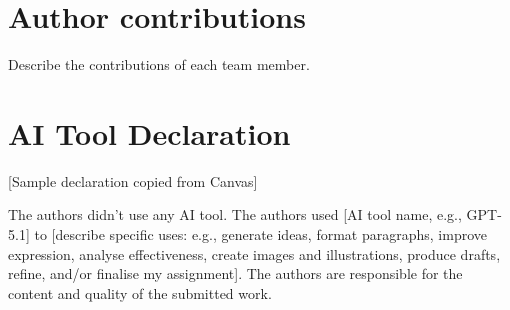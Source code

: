 \documentclass{article}
\begin{document}
\section{Author contributions}
Describe the contributions of each team member.

\section{AI Tool Declaration}

[Sample declaration copied from Canvas]

The authors didn't use any AI tool. The authors used [AI tool name, e.g., GPT-5.1] to [describe specific uses: e.g., generate ideas, format paragraphs, improve expression, analyse effectiveness, create images and illustrations, produce drafts, refine, and/or finalise my assignment]. The authors are responsible for the content and quality of the submitted work.



\end{document}
